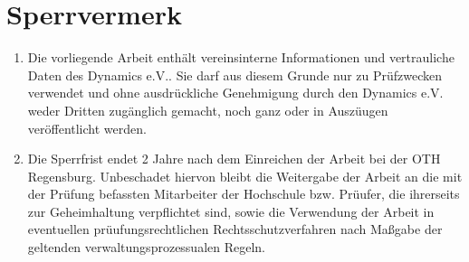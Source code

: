 \thispagestyle{empty}
\chapter*{Sperrvermerk }

\bigskip
\bigskip
\bigskip


\begin{enumerate}
    \item Die vorliegende Arbeit enthält vereinsinterne Informationen und vertrauliche              Daten des Dynamics
            e.V.. Sie darf aus diesem Grunde nur zu Prüfzwecken verwendet und ohne ausdrückliche Genehmigung
            durch den Dynamics e.V. weder Dritten zugänglich gemacht, noch ganz oder in Auszüugen veröffentlicht werden. 
\item Die Sperrfrist endet 2 Jahre nach dem Einreichen der Arbeit bei der OTH Regensburg.
        Unbeschadet hiervon bleibt die Weitergabe der Arbeit an die mit der Prüfung befassten Mitarbeiter
        der Hochschule bzw. Prüufer, die ihrerseits zur Geheimhaltung verpflichtet sind, sowie die Verwendung
        der Arbeit in eventuellen prüufungsrechtlichen Rechtsschutzverfahren nach Maßgabe der geltenden verwaltungsprozessualen Regeln.
\end{enumerate}

\pagebreak
